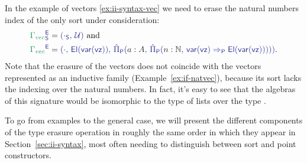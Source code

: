 \begin{example}[Vectors]\label{ex:red-e-vec}
In the example of vectors \ref{ex:ii-syntax-vec} we need to erase the natural numbers
index of the only sort under consideration:
\begin{align*}
\tqm{\grm{\Gamma_{vec}}^\EE_\Sc}
 &= \tqm{(\cdot_\Sc,\, \UU)} \text{ and} \\
\tqm{\grm{\Gamma_{vec}}^\EE}
  &= \tqm{(\cdot,\, \El(\var(\vz)),\, 
    \ExtPiP{a : A}{\ExtPiP{n : \N}{
    \var(\vz) \Rightarrow_\Pc \El(\var(\vz))}})} \text{.}
\end{align*}
Note that the erasure of the vectors does not coincide with the vectors represented
as an inductive family (Example~\ref{ex:if-natvec}), because its sort lacks the
indexing over the natural numbers.
In fact, it's easy to see that the algebras of this signature would be isomorphic
to the type of lists over the type .
\end{example}

To go from examples to the general case, we will present the different components
of the type erasure operation in roughly the same order in which they appear in
Section~\ref{sec:ii-syntax}, most often needing to distinguish between sort
and point constructors.

